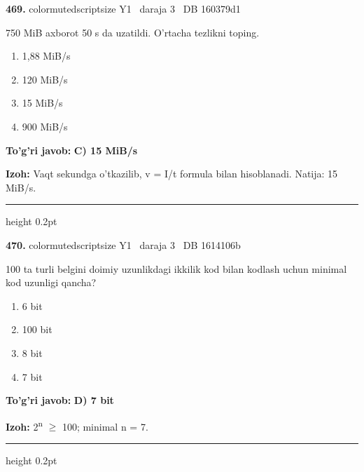 \documentclass[10pt,a4paper,oneside]{article}
\begin{document}
\noindent\textbf{\color{ink}469.}  {color{muted}scriptsize Y1 \textbullet\ daraja 3 \textbullet\ DB 160379d1}
\par
750 MiB axborot 50 s da uzatildi. O'rtacha tezlikni toping.
\begin{enumerate}[label=\Alph*),leftmargin=9mm]
\item 1,88 MiB/s
\item 120 MiB/s
\item 15 MiB/s
\item 900 MiB/s
\end{enumerate}
\begin{tcolorbox}[enhanced,breakable,colback=teal!4,colframe=teal!50!black,boxrule=0.5pt,arc=1.1mm,left=3mm,right=3mm,top=1.7mm,bottom=1.7mm,before skip=2mm,after skip=2mm]
\textbf{\color{teal}To'g'ri javob:} \textbf{C) 15 MiB/s}
\par\smallskip
\textbf{Izoh:} Vaqt sekundga o'tkazilib, v = I/t formula bilan hisoblanadi. Natija: 15 MiB/s.
\end{tcolorbox}
\vspace{2mm}\hrule height 0.2pt \vspace{3mm}

\noindent\textbf{\color{ink}470.}  {color{muted}scriptsize Y1 \textbullet\ daraja 3 \textbullet\ DB 1614106b}
\par
100 ta turli belgini doimiy uzunlikdagi ikkilik kod bilan kodlash uchun minimal kod uzunligi qancha?
\begin{enumerate}[label=\Alph*),leftmargin=9mm]
\item 6 bit
\item 100 bit
\item 8 bit
\item 7 bit
\end{enumerate}
\begin{tcolorbox}[enhanced,breakable,colback=teal!4,colframe=teal!50!black,boxrule=0.5pt,arc=1.1mm,left=3mm,right=3mm,top=1.7mm,bottom=1.7mm,before skip=2mm,after skip=2mm]
\textbf{\color{teal}To'g'ri javob:} \textbf{D) 7 bit}
\par\smallskip
\textbf{Izoh:} 2\textsuperscript{n} \ensuremath{\geq} 100; minimal n = 7.
\end{tcolorbox}
\vspace{2mm}\hrule height 0.2pt \vspace{3mm}
\end{document}
